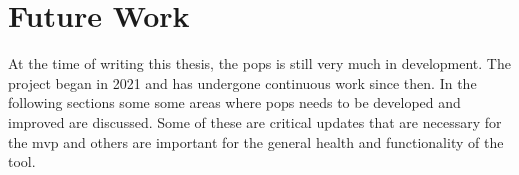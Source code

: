 \glsresetall{} 

\chapter{Future Work}\label{chap:discussion}


At the time of writing this thesis, the \gls{pops} is still very much in
development. The project began in 2021 and has undergone continuous work since
then. In the following sections some some areas where \gls{pops} needs to be
developed and improved are discussed. Some of these are critical updates that
are necessary for the \gls{mvp} and others are important for the general health
and functionality of the tool.




